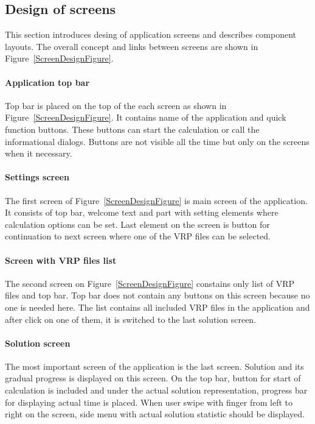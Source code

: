 \subsection{Design of screens}\label{ScreenDesignSection}
This section introduces desing of application screens and describes component layouts. The overall concept and
links between screens are shown in Figure~\ref{ScreenDesignFigure}.

\paragraph{Application top bar}
Top bar is placed on the top of the each screen as shown in Figure~\ref{ScreenDesignFigure}. It contains name of the
application and quick function buttons. These buttons can start the calculation or call the informational dialogs.
Buttons are not visible all the time but only on the screens when it necessary.

\paragraph{Settings screen}
The first screen of Figure~\ref{ScreenDesignFigure} is main screen of the application. It consists of top bar, welcome
text and part with setting elements where calculation options can be set. Last element on the screen is button for
continuation to next screen where one of the VRP files can be selected.

\paragraph{Screen with VRP files list}
The second screen on Figure~\ref{ScreenDesignFigure} constains only list of VRP files and top bar. Top bar does not
contain any buttons on this screen because no one is needed here. The list contains all included VRP files in
the application and after click on one of them, it is switched to the last solution screen.

\paragraph{Solution screen}
The most important screen of the application is the last screen. Solution and its gradual progress is displayed on this
screen. On the top bar, button for start of calculation is included and under the actual solution representation,
progress bar for displaying actual time is placed. When user swipe with finger from left to right on the screen,
side menu with actual solution statistic  should be displayed.

